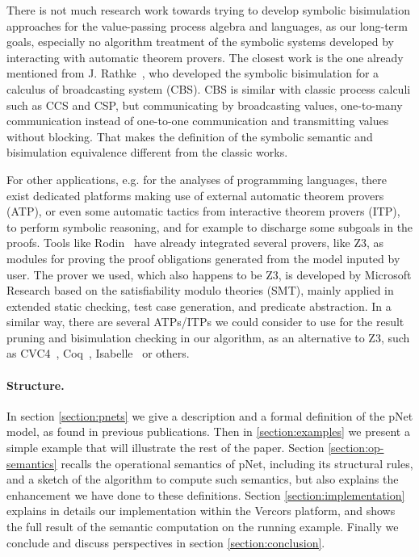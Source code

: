 \documentclass{lncs/llncs}
\newcommand{\TODO}[1]{\textcolor{red}{\textbf{[TODO:#1]}}}
\begin{document}


There is not much research work towards trying to develop symbolic bisimulation approaches
for the value-passing process algebra and languages, as our long-term goals,
especially no algorithm treatment of the symbolic systems developed by
interacting with automatic theorem provers. The closest work is the
one already mentioned from J. Rathke~\cite{HennessyRathke:TCS98},
who developed the symbolic bisimulation for a
calculus of broadcasting system (CBS). CBS is similar with classic
process calculi such as CCS and CSP, but communicating by broadcasting
values, one-to-many communication instead of one-to-one communication
and transmitting values without blocking. That makes the definition of
the symbolic semantic and bisimulation equivalence different from the
classic works.


For other applications, e.g. for the analyses of 
programming languages, there exist dedicated platforms making use of
external automatic theorem 
provers (ATP), or even some automatic tactics from interactive theorem
provers (ITP), to perform symbolic reasoning, and for example to
discharge some subgoals in the proofs.
Tools like Rodin~\cite{deharbe2013,deharbe2014,abrial2007} have
already integrated several provers, like Z3, as modules for proving
the proof obligations generated from the model inputed by user. 
The prover we used, which also happens to be Z3, is developed by Microsoft Research
based on the satisfiability modulo 
theories (SMT), mainly applied in extended static checking, test case
generation, and predicate abstraction.
In a similar way, there are several ATPs/ITPs we could consider to use for
the result pruning and bisimulation checking in our algorithm, as an
alternative to Z3, such as CVC4~\cite{barrett:CAV2011},
Coq~\cite{armand:CPP2011},
Isabelle~\cite{blanchette:FroCoS2011} or others. 


\paragraph{Structure.}
In section
\ref{section:pnets} we give a description and a formal definition of
the pNet model, as found in previous publications. Then in
\ref{section:examples} we present a simple example that will
illustrate the rest of the paper.
Section \ref{section:op-semantics} recalls the operational semantics
of pNet, including its structural rules, and a sketch of the algorithm
to compute such semantics, but also explains the enhancement we have
done to these definitions.
Section \ref{section:implementation} explains in details our
implementation within the Vercors platform, and shows the full result of
the semantic computation on the running example.
Finally we conclude and discuss perspectives in section
\ref{section:conclusion}. 
\end{document}
